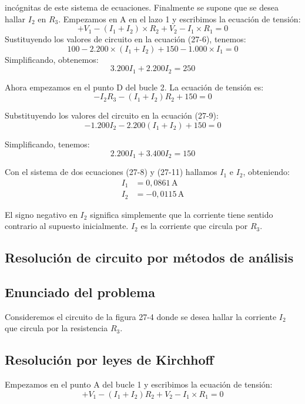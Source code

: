 \noindent incógnitas de este sistema de ecuaciones. Finalmente se supone que se desea hallar 
$I_2$ en $R_3$. Empezamos en A en el lazo 1 y escribimos la ecuación de tensión: 
\[
+ V_1 - (I_1 + I_2) \times R_2 + V_2 - I_1 \times R_1 = 0
\tag{27-6}
\]
\noindent Sustituyendo los valores de circuito en la ecuación (27-6), tenemos:
\[
100 - 2.200 \times (I_1 + I_2) + 150 - 1.000 \times I_1 = 0
\tag{27-7}
\]
\noindent Simplificando, obtenemos:
\[
3.200I_1 + 2.200I_2 = 250
\tag{27-8}
\]

\noindent Ahora empezamos en el punto D del bucle 2. La ecuación de tensión es:
\[
- I_2R_3 - (I_1 + I_2)R_2 + 150 = 0
\tag{27-9}
\]

\noindent Substituyendo los valores del circuito en la ecuación (27-9):
\[
- 1.200I_2 - 2.200(I_1 + I_2) + 150 = 0
\tag{27-10}
\]

\noindent Simplificando, tenemos:
\[
2.200I_1 + 3.400I_2 = 150
\tag{27-11}
\]

\noindent Con el sistema de dos ecuaciones (27-8) y (27-11) hallamos $I_1$ e $I_2$, obteniendo:
\[
\begin{aligned}
I_1 &= 0,0861 \, \text{A} \\
I_2 &= -0,0115 \, \text{A}
\end{aligned}
\]  

\noindent El signo negativo en $I_2$ significa simplemente que la corriente tiene sentido contrario al supuesto inicialmente. $I_2$ es la corriente que circula por $R_3$.

\subsection{Resolución de circuito por métodos de análisis}

\subsection{Enunciado del problema}
Consideremos el circuito de la figura 27-4 donde se desea hallar la corriente $I_2$ que circula por la resistencia $R_3$.

\subsection{Resolución por leyes de Kirchhoff}
Empezamos en el punto A del bucle 1 y escribimos la ecuación de tensión:
\[
+ V_1 - (I_1 + I_2)R_2 + V_2 - I_1 \times R_1 = 0
\tag{27-6}
\]

